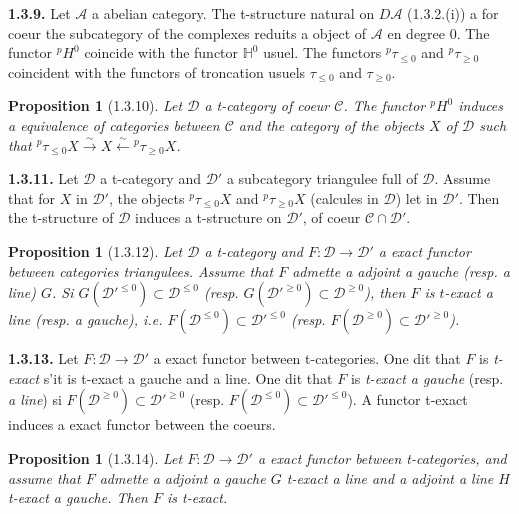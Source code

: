 \documentclass[12pt,a4paper]{article}
\theoremstyle{plain}
\newtheorem{proposition}[theorem]{Proposition}
\theoremstyle{definition}
\theoremstyle{remark}
\newcommand{\HH}{\mathbb{H}}
\newcommand{\cA}{\mathcal{A}}
\newcommand{\cC}{\mathcal{C}}
\newcommand{\cD}{\mathcal{D}}
\begin{document}
\smallskip

\noindent
\textbf{1.3.9.} Let $\cA$ a abelian category. The t-structure natural on $D\cA$ (1.3.2.(i)) a for coeur the subcategory of the complexes reduits a object of $\cA$ en degree $0$. The functor ${}^{p}H^{0}$ coincide with the functor $\HH^{0}$ usuel. The functors ${}^{p}\tau_{\leq 0}$ and ${}^{p}\tau_{\geq 0}$ coincident with the functors of troncation usuels $\tau_{\leq 0}$ and $\tau_{\geq 0}$.

\smallskip

\begin{proposition}[1.3.10]
Let $\cD$ a t-category of coeur $\cC$. The functor ${}^{p}H^{0}$ induces a equivalence of categories between $\cC$ and the category of the objects $X$ of $\cD$ such that ${}^{p}\tau_{\leq 0}X \xrightarrow{\sim} X \xleftarrow{\sim} {}^{p}\tau_{\geq 0}X$.
\end{proposition}

\smallskip

\noindent
\textbf{1.3.11.} Let $\cD$ a t-category and $\cD'$ a subcategory triangulee full of $\cD$. Assume that for $X$ in $\cD'$, the objects ${}^{p}\tau_{\leq 0}X$ and ${}^{p}\tau_{\geq 0}X$ (calcules in $\cD$) let in $\cD'$. Then the t-structure of $\cD$ induces a t-structure on $\cD'$, of coeur $\cC \cap \cD'$.

\smallskip

\begin{proposition}[1.3.12]
Let $\cD$ a t-category and $F : \cD \to \cD'$ a exact functor between categories triangulees. Assume that $F$ admette a adjoint a gauche (resp. a line) $G$. Si $G(\cD'^{\leq 0}) \subset \cD^{\leq 0}$ (resp. $G(\cD'^{\geq 0}) \subset \cD^{\geq 0}$), then $F$ is $t$-exact a line (resp. a gauche), i.e. $F(\cD^{\leq 0}) \subset \cD'^{\leq 0}$ (resp. $F(\cD^{\geq 0}) \subset \cD'^{\geq 0}$).
\end{proposition}

\smallskip

\noindent
\textbf{1.3.13.} Let $F : \cD \to \cD'$ a exact functor between t-categories. One dit that $F$ is \emph{t-exact} s'it is t-exact a gauche and a line. One dit that $F$ is \emph{t-exact a gauche} (resp. \emph{a line}) si $F(\cD^{\geq 0}) \subset \cD'^{\geq 0}$ (resp. $F(\cD^{\leq 0}) \subset \cD'^{\leq 0}$). A functor t-exact induces a exact functor between the coeurs.

\smallskip

\begin{proposition}[1.3.14]
Let $F : \cD \to \cD'$ a exact functor between t-categories, and assume that $F$ admette a adjoint a gauche $G$ t-exact a line and a adjoint a line $H$ t-exact a gauche. Then $F$ is t-exact.
\end{proposition}
\end{document}
